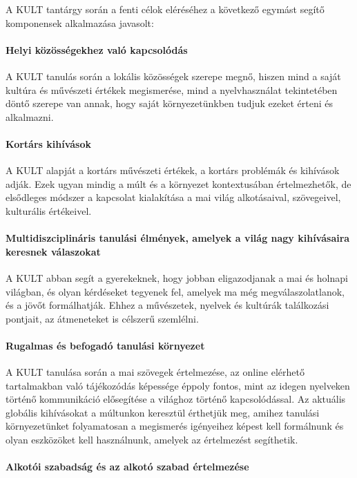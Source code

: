 A KULT tantárgy során a fenti célok eléréséhez a következő egymást segítő
komponensek alkalmazása javasolt:

\paragraph{Helyi közösségekhez való kapcsolódás}

A KULT tanulás során a lokális közösségek szerepe megnő, hiszen mind a saját
kultúra és művészeti értékek megismerése, mind a nyelvhasználat tekintetében
döntő szerepe van annak, hogy saját környezetünkben  tudjuk ezeket érteni és
alkalmazni.

\paragraph{Kortárs kihívások}

A KULT alapját a kortárs művészeti értékek, a kortárs problémák és kihívások
adják. Ezek ugyan mindig a múlt és a környezet kontextusában értelmezhetők, de
elsődleges módszer a kapcsolat kialakítása a mai világ alkotásaival,
szövegeivel, kulturális értékeivel.

\paragraph{Multidiszciplináris tanulási élmények, amelyek a világ nagy
  kihívásaira keresnek válaszokat}

A KULT abban segít a gyerekeknek, hogy jobban eligazodjanak a mai és holnapi
világban, és olyan kérdéseket tegyenek fel, amelyek ma még megválaszolatlanok, és
a jövőt formálhatják. Ehhez a művészetek, nyelvek és kultúrák találkozási
pontjait, az átmeneteket is célszerű szemlélni.

\paragraph{Rugalmas és befogadó tanulási környezet}

A KULT tanulása során a mai szövegek értelmezése, az online elérhető
tartalmakban való tájékozódás képessége éppoly fontos, mint az idegen nyelveken
történő kommunikáció elősegítése a világhoz történő kapcsolódással. Az aktuális
globális kihívásokat a múltunkon keresztül érthetjük meg, amihez tanulási
környezetünket folyamatosan a megismerés igényeihez képest kell formálnunk és
olyan eszközöket kell használnunk, amelyek az értelmezést segíthetik.

\paragraph{Alkotói szabadság és az alkotó szabad értelmezése}

